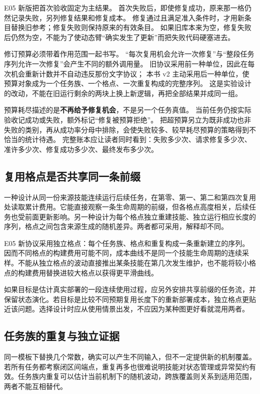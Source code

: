 E05 新版把首次验收固定为主结果。
首次失败后，即使修复成功，原来那一格仍然记录失败，另列修复结果和修复成本。
修复通过且满足准入条件时，才用新条目替换旧参考；修复失败则保持原来的有效条目。
如果旧库本来为空，修复失败后仍然为空，不能为了使动态臂``确实发生了更新''而把失败代码硬塞进去。

修订预算必须带着作用范围一起书写。
``每次复用机会允许一次修复''与``整段任务序列允许一次修复''会产生不同的额外调用量。
旧协议采用前一种单位，因此在每次机会重新计数并不自动违反那份文字协议；
本书 v2 主动采用后一种单位，使预算对象成为一个任务族、一个格点、一次重复构成的完整序列。
这是实验设计的改动，不能在旧运行剩余的两块上换上新逻辑，再把全部结果并成同一组。

预算耗尽描述的是\textbf{不再给予修复机会}，不是另一个任务真值。
当前任务仍按实际验收记成功或失败，额外标记``修复被预算拒绝''。
把超预算另立为既非成功也非失败的类别，再从成功率分母中排除，会使失败较多、较早耗尽预算的策略得到不恰当的统计待遇。
完整账本应让读者同时看到：失败多少次、请求修复多少次、准许多少次、修复成功多少次、最终发布多少次。

\subsection{复用格点是否共享同一条前缀}

一种设计从同一份来源技能连续运行后续任务，在第零、第一、第二和第四次复用处读取累计费用。它能直接观察一条生命周期的前缀，但各格点高度相关，后续任务也受前面更新影响。另一种设计为每个格点独立重建技能、独立运行相应长度的序列，格点之间包含来源生成的随机差异。两者都可采用，解释却不同。

E05 新协议采用独立格点：每个任务族、格点和重复构成一条重新建立的序列。因而不同格点的构建费用可能不同，成本曲线不是同一个技能生命周期的连续采样。不能从独立格点的波动直接推出某条技能在第几次发生维护，也不能将较小格点的构建费用替换进较大格点以获得更平滑曲线。

如果目标是估计真实部署的一段连续使用过程，应另外安排共享前缀的任务流，并保留状态演化。若目标是比较不同预期复用长度下的重新部署成本，独立格点更贴近该问题。选择设计时应从使用情景出发，不应因为某种图更好看就混用两者。

\subsection{任务族的重复与独立证据}

同一模板下替换几个常数，确实可以产生不同输入，但不一定提供新的机制覆盖。若所有任务都考察闭区间端点，重复再多也很难说明技能对状态管理或异常契约有效。任务族内重复可以估计当前机制下的随机波动，跨族覆盖则关系到适用范围，两者不能互相替代。

